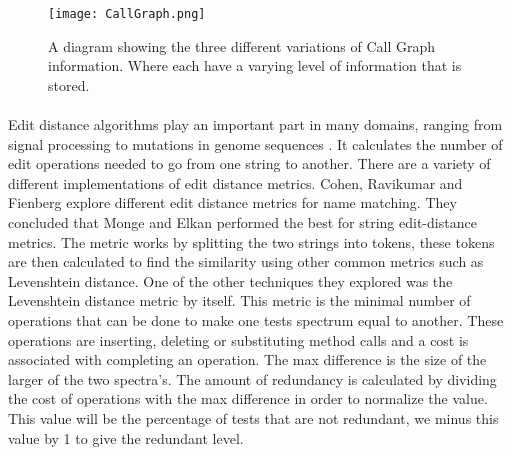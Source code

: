 \begin{figure}[h]
\begin{center}
\texttt{[image: CallGraph.png]}
\end{center}
\caption{A diagram showing the three different variations of Call Graph information. Where  each have a varying level of information that is stored.}
\label{fig:callgraph}
\end{figure}

\paragraph{}
Edit distance algorithms play an important part in many domains, ranging from signal processing to mutations in genome sequences \cite{navarro2001guided}. It calculates the number of edit operations needed to go from one string to another. There are a variety of different implementations of edit distance metrics. Cohen, Ravikumar and Fienberg \cite{cohen2003comparison} explore different edit distance metrics for name matching. They concluded that Monge and Elkan \cite{monge1997efficient} performed the best for string edit-distance metrics. The metric works by splitting the two strings into tokens, these tokens are then calculated to find the similarity using other common metrics such as Levenshtein distance. One of the other techniques they explored was the Levenshtein distance \cite{levenshtein1966binary} metric by itself. This metric is the minimal number of operations that can be done to make one tests spectrum equal to another. These operations are inserting, deleting or substituting method calls and a cost is associated with completing an operation. The max difference is the size of the larger of the two spectra's. The amount of redundancy is calculated by dividing the cost of operations with the max difference in order to normalize the value. This value will be the percentage of tests that are not redundant, we minus this value by 1 to give the redundant level.

